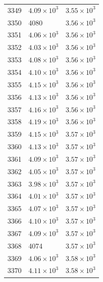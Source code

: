 \begin{table}[H]
\begin{tabular}{lll}
3349 & $\displaystyle 4.09 \times 10^{3}$ & $\displaystyle 3.55 \times 10^{3}$ \\
3350 & 4080 & $\displaystyle 3.56 \times 10^{3}$ \\
3351 & $\displaystyle 4.06 \times 10^{3}$ & $\displaystyle 3.56 \times 10^{3}$ \\
3352 & $\displaystyle 4.03 \times 10^{3}$ & $\displaystyle 3.56 \times 10^{3}$ \\
3353 & $\displaystyle 4.08 \times 10^{3}$ & $\displaystyle 3.56 \times 10^{3}$ \\
3354 & $\displaystyle 4.10 \times 10^{3}$ & $\displaystyle 3.56 \times 10^{3}$ \\
3355 & $\displaystyle 4.15 \times 10^{3}$ & $\displaystyle 3.56 \times 10^{3}$ \\
3356 & $\displaystyle 4.13 \times 10^{3}$ & $\displaystyle 3.56 \times 10^{3}$ \\
3357 & $\displaystyle 4.16 \times 10^{3}$ & $\displaystyle 3.56 \times 10^{3}$ \\
3358 & $\displaystyle 4.19 \times 10^{3}$ & $\displaystyle 3.56 \times 10^{3}$ \\
3359 & $\displaystyle 4.15 \times 10^{3}$ & $\displaystyle 3.57 \times 10^{3}$ \\
3360 & $\displaystyle 4.13 \times 10^{3}$ & $\displaystyle 3.57 \times 10^{3}$ \\
3361 & $\displaystyle 4.09 \times 10^{3}$ & $\displaystyle 3.57 \times 10^{3}$ \\
3362 & $\displaystyle 4.05 \times 10^{3}$ & $\displaystyle 3.57 \times 10^{3}$ \\
3363 & $\displaystyle 3.98 \times 10^{3}$ & $\displaystyle 3.57 \times 10^{3}$ \\
3364 & $\displaystyle 4.01 \times 10^{3}$ & $\displaystyle 3.57 \times 10^{3}$ \\
3365 & $\displaystyle 4.07 \times 10^{3}$ & $\displaystyle 3.57 \times 10^{3}$ \\
3366 & $\displaystyle 4.10 \times 10^{3}$ & $\displaystyle 3.57 \times 10^{3}$ \\
3367 & $\displaystyle 4.09 \times 10^{3}$ & $\displaystyle 3.57 \times 10^{3}$ \\
3368 & 4074 & $\displaystyle 3.57 \times 10^{3}$ \\
3369 & $\displaystyle 4.06 \times 10^{3}$ & $\displaystyle 3.58 \times 10^{3}$ \\
3370 & $\displaystyle 4.11 \times 10^{3}$ & $\displaystyle 3.58 \times 10^{3}$ \\

\end{tabular}
\end{table}

